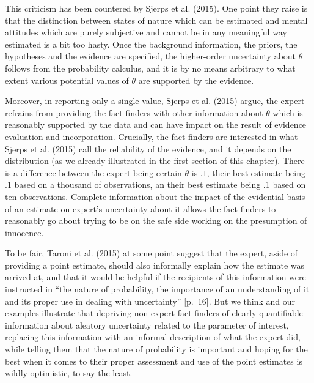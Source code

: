 \documentclass[
  10pt,
  dvipsnames,enabledeprecatedfontcommands]{scrartcl}
\begin{document}
This criticism has been countered by Sjerps et al. (2015). One point
they raise is that the distinction between states of nature which can be
estimated and mental attitudes which are purely subjective and cannot be
in any meaningful way estimated is a bit too hasty. Once the background
information, the priors, the hypotheses and the evidence are specified,
the higher-order uncertainty about \(\theta\) follows from the
probability calculus, and it is by no means arbitrary to what extent
various potential values of \(\theta\) are supported by the evidence.

Moreover, in reporting only a single value, Sjerps et al. (2015) argue,
the expert refrains from providing the fact-finders with other
information about \(\theta\) which is reasonably supported by the data
and can have impact on the result of evidence evaluation and
incorporation. Crucially, the fact finders are interested in what Sjerps
et al. (2015) call the reliability of the evidence, and it depends on
the distribution (as we already illustrated in the first section of this
chapter). There is a difference between the expert being certain
\(\theta\) is \(.1\), their best estimate being .1 based on a thousand
of observations, an their best estimate being .1 based on ten
observations. Complete information about the impact of the evidential
basis of an estimate on expert's uncertainty about it allows the
fact-finders to reasonably go about trying to be on the safe side
working on the presumption of innocence.

To be fair, Taroni et al. (2015) at some point suggest that the expert,
aside of providing a point estimate, should also informally explain how
the estimate was arrived at, and that it would be helpful if the
recipients of this information were instructed in ``the nature of
probability, the importance of an understanding of it and its proper use
in dealing with uncertainty'' {[}p.~16{]}. But we think and our examples
illustrate that depriving non-expert fact finders of clearly
quantifiable information about aleatory uncertainty related to the
parameter of interest, replacing this information with an informal
description of what the expert did, while telling them that the nature
of probability is important and hoping for the best when it comes to
their proper assessment and use of the point estimates is wildly
optimistic, to say the least.
\end{document}
